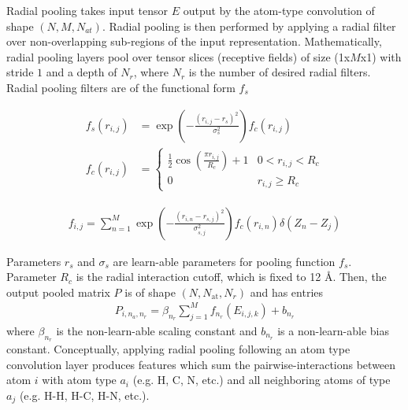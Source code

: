 Radial pooling takes input tensor $E$ output by the atom-type convolution of shape $(N,M,N_{at})$. Radial pooling is then performed by applying a radial filter over non-overlapping sub-regions of the input representation.  Mathematically, radial pooling layers pool over tensor slices (receptive fields) of size (1x$M$x1) with stride $1$ and a depth of $N_r$, where $N_r$ is the number of desired radial filters.  Radial pooling filters are of the functional form $f_s$

\begin{eqnarray*}
f_s(r_{i,j}) &= \exp\left(-\frac{(r_{i,j} - r_s)^2}{\sigma_s^2}\right)f_c(r_{i,j})\\
f_c(r_{i,j}) &= \begin{cases} 
      \frac{1}{2}\cos\left (\frac{\pi r_{i,j}}{R_c}\right) + 1 & 0 < r_{i,j} < R_c \\
      0 & r_{i,j} \geq R_c
   \end{cases}
\end{eqnarray*}

\begin{eqnarray*}
f_{i, j} = \sum_{n=1}^M \exp\left(-\frac{(r_{i,n} - r_{s,j})^2}{\sigma_{s,j}^2}\right)f_c(r_{i,n})\delta(Z_n - Z_j)
\end{eqnarray*}

Parameters $r_s$ and $\sigma_s$ are learn-able parameters for pooling function $f_s$. Parameter $R_c$ is the radial interaction cutoff, which is fixed to 12 Å.  Then, the output pooled matrix $P$ is of shape $(N,N_\textrm{at},N_r)$ and has entries
\begin{eqnarray*}
P_{i,n_a,n_r} = \beta_{n_r} \sum_{j=1}^M f_{n_r}(E_{i,j,k}) + b_{n_r}
\end{eqnarray*}
where $\beta_{n_r}$ is the non-learn-able scaling constant and $b_{n_r}$ is a non-learn-able bias constant.  Conceptually, applying radial pooling following an atom type convolution layer produces features which sum the pairwise-interactions between atom $i$ with atom type $a_i$ (e.g. H, C, N, etc.) and all neighboring atoms of type $a_j$ (e.g. H-H, H-C, H-N, etc.). 

